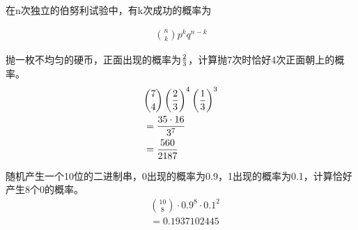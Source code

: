 在n次独立的伯努利试验中，有k次成功的概率为

\vspace{-1cm}

\begin{align}
	{n \choose k} p^k q^{n-k}
\end{align}

\begin{tcolorbox}
	抛一枚不均匀的硬币，正面出现的概率为$ 2 \over 3 $，计算抛7次时恰好4次正面朝上的概率。
	\begin{align*}
		 & {7 \choose 4} \left({2 \over 3}\right)^4 \left({1 \over 3}\right)^3 \\
		 & = {35 \cdot 16 \over 3^7}                                           \\
		 & = {560 \over 2187}
	\end{align*}
\end{tcolorbox}

\begin{tcolorbox}
	随机产生一个10位的二进制串，0出现的概率为0.9，1出现的概率为0.1，计算恰好产生8个0的概率。
	\begin{align*}
		 & {10 \choose 8} \cdot 0.9^8 \cdot 0.1^2 \\
		 & = 0.1937102445
	\end{align*}
\end{tcolorbox}

\newpage